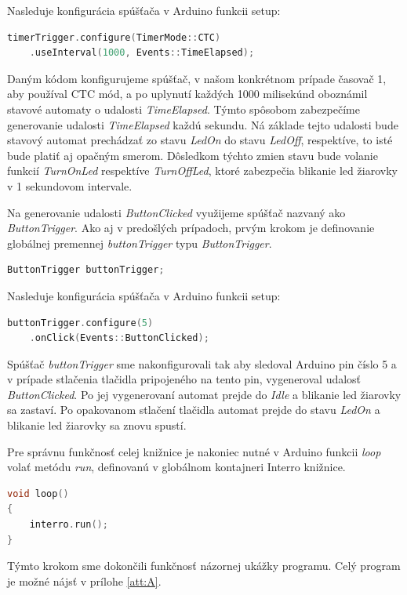 Nasleduje konfigurácia spúšťača v Arduino funkcii setup:
\begin{lstlisting}[language=c++]  
timerTrigger.configure(TimerMode::CTC)
    .useInterval(1000, Events::TimeElapsed); 
\end{lstlisting}

Daným kódom konfigurujeme spúšťač, v našom konkrétnom prípade časovač 1, aby používal CTC mód, a po uplynutí každých 1000 milisekúnd oboznámil stavové automaty
o udalosti \textit{TimeElapsed}. Týmto spôsobom zabezpečíme generovanie udalosti \textit{TimeElapsed} každú sekundu. Ná základe tejto udalosti bude stavový automat
prechádzať zo stavu \textit{LedOn} do stavu \textit{LedOff}, respektíve, to isté bude platiť aj opačným smerom. Dôsledkom týchto zmien stavu bude volanie funkcií
\textit{TurnOnLed} respektíve \textit{TurnOffLed}, ktoré zabezpečia blikanie led žiarovky v 1 sekundovom intervale.  \par

Na generovanie udalosti \textit{ButtonClicked} využijeme spúšťač nazvaný ako \textit{ButtonTrigger}. Ako aj v predošlých prípadoch, prvým krokom je definovanie globálnej premennej
\textit{buttonTrigger} typu \textit{ButtonTrigger}.

\begin{lstlisting}[language=c++]  
ButtonTrigger buttonTrigger;            
\end{lstlisting}

Nasleduje konfigurácia spúšťača v Arduino funkcii setup:
\begin{lstlisting}[language=c++]  
buttonTrigger.configure(5)
    .onClick(Events::ButtonClicked); 
\end{lstlisting}

Spúšťač \textit{buttonTrigger} sme nakonfigurovali tak aby sledoval Arduino pin číslo 5 a v prípade stlačenia tlačidla pripojeného na tento pin, vygeneroval udalosť
\textit{ButtonClicked}. Po jej vygenerovaní automat prejde do  \textit{Idle} a blikanie led žiarovky sa zastaví. Po opakovanom stlačení tlačidla automat prejde do
stavu \textit{LedOn} a blikanie led žiarovky sa znovu spustí. \par
Pre správnu funkčnosť celej knižnice je nakoniec nutné v Arduino funkcii \textit{loop} volať metódu \textit{run}, definovanú v globálnom kontajneri Interro knižnice.
\begin{lstlisting}[language=c++]  
void loop()
{
    interro.run();
}
\end{lstlisting}

Týmto krokom sme dokončili funkčnosť názornej ukážky programu. Celý program je možné nájsť v prílohe \ref{att:A}.

